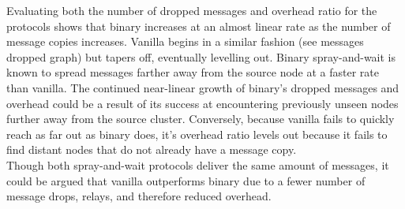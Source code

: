 \documentclass{article}
\begin{document}
\newline Evaluating both the number of dropped messages and overhead ratio for the protocols shows that binary increases at an almost linear rate as the number of message copies increases. Vanilla begins in a similar fashion (see messages dropped graph) but tapers off, eventually levelling out. Binary spray-and-wait is known to spread messages farther away from the source node at a faster rate than vanilla. The continued near-linear growth of binary's dropped messages and overhead could be a result of its success at encountering previously unseen nodes further away from the source cluster. Conversely, because vanilla fails to quickly reach as far out as binary does, it's overhead ratio levels out because it fails to find distant nodes that do not already have a message copy.\\
\newline Though both spray-and-wait protocols deliver the same amount of messages, it could be argued that vanilla outperforms binary due to a fewer number of message drops, relays, and therefore reduced overhead.

\end{document}
